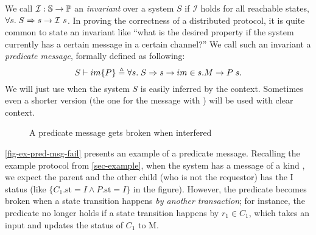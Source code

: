 \documentclass[sigplan,10pt,review,anonymous,screen]{acmart}\settopmatter{printfolios=true,printccs=false,printacmref=false}
\begin{document}
We call $\mathcal{I}: \mathbb{S}{} \to \mathbb{P}{}$ an \emph{invariant} over a system $S$ if $\mathcal{I}$ holds for all reachable states, \ie{} $\forall s.\; S \Rightarrow s \to \mathcal{I}\ s$.
In proving the correctness of a distributed protocol, it is quite common to state an invariant like ``what is the desired property if the system currently has a certain message in a certain channel?''
We call such an invariant a \emph{predicate message}, formally defined as following:
\begin{displaymath}
  S \vdash im\{P\} \triangleq \forall s.\; S \Rightarrow s \to im \in s.M \to P\; s.
\end{displaymath}
We will just use  when the system $S$ is easily inferred by the context.
Sometimes even a shorter version  (the one for the message with \msgid{}) will be used with clear context.

\begin{figure}[h]
  \centering
  \caption{A predicate message gets broken when interfered}
  \vspace{-5pt}
  \label{fig-ex-pred-msg-fail}
\end{figure}

\autoref{fig-ex-pred-msg-fail} presents an example of a predicate message.
Recalling the example protocol from \autoref{sec-example}, when the system has a message of a kind , we expect the parent and the other child (who is not the requestor) has the I status (like {\color{myblue} $\{C_1.\textrm{st} = I \wedge P.\textrm{st} = I\}$} in the figure).
However, the predicate becomes broken when a state transition happens \emph{by another transaction}; for instance, the predicate no longer holds if a state transition happens by {\color{myred} $r_1 \in C_1$}, which takes an input {\color{myred} } and updates the status of $C_1$ to M.
\end{document}
